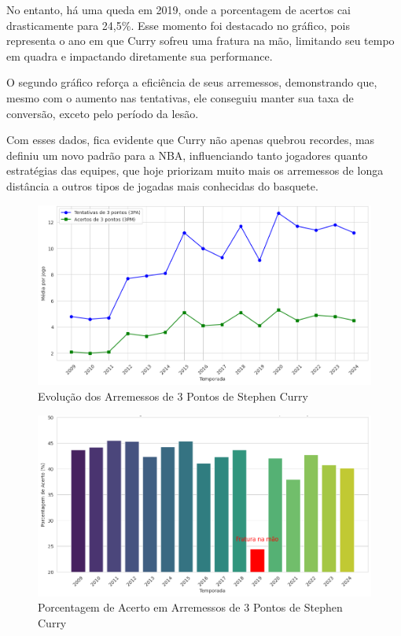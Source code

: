No entanto, há uma queda em 2019, onde a porcentagem de acertos cai drasticamente para 24,5\%. Esse
momento foi destacado no gráfico, pois representa o ano em que Curry sofreu uma fratura na mão, limitando
seu tempo em quadra e impactando diretamente sua performance.

O segundo gráfico reforça a eficiência de seus arremessos, demonstrando que, mesmo com o aumento nas
tentativas, ele conseguiu manter sua taxa de conversão, exceto pelo período da lesão.

Com esses dados, fica evidente que Curry não apenas quebrou recordes, mas definiu um novo padrão para a
NBA, influenciando tanto jogadores quanto estratégias das equipes, que hoje priorizam muito mais os
arremessos de longa distância a outros tipos de jogadas mais conhecidas do basquete.


\begin{figure}[H]
\centering
\includegraphics[width=\linewidth]{apendices/fig/14_IAA007_1.png}
\caption{Evolução dos Arremessos de 3 Pontos de Stephen Curry}
\end{figure}

\begin{figure}[H]
\centering
\includegraphics[width=\linewidth]{apendices/fig/14_IAA007_2.png}
\caption{Porcentagem de Acerto em Arremessos de 3 Pontos de Stephen Curry}
\end{figure}


